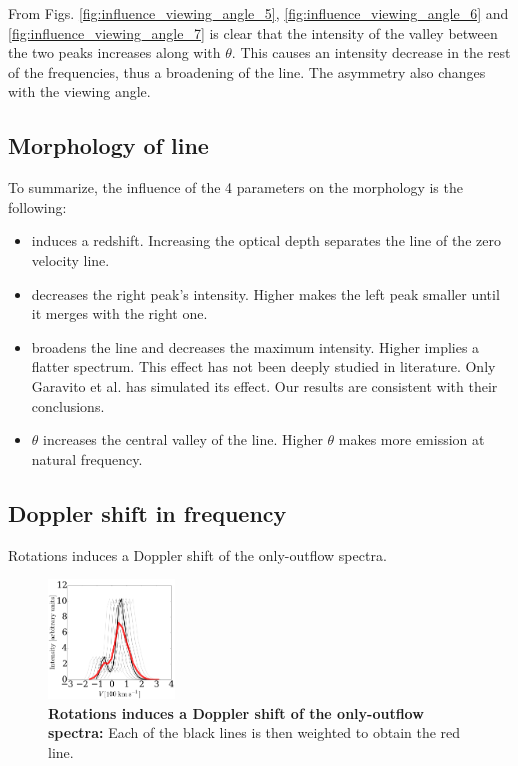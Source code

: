 \documentclass[twocolappendix]{latex/emulateapj}
\begin{document}
From Figs. \ref{fig:influence_viewing_angle_5}, \ref{fig:influence_viewing_angle_6} and \ref{fig:influence_viewing_angle_7} is clear that the intensity of the valley between the two peaks increases along with $\theta$. This causes an intensity decrease in the rest of the frequencies, thus a broadening of the line. The asymmetry also changes with the viewing angle.\\


\subsection{Morphology of \lya line}

To summarize, the influence of the 4 parameters on the \lya morphology is the following: 

\begin{itemize}
	\item \tauh induces a redshift. Increasing the optical depth separates the line of the zero velocity line. \\
	\item \vout decreases the right peak's intensity. Higher \vout makes the left peak smaller until it merges with the right one. \\
	\item \vrot broadens the line and decreases the maximum intensity. Higher \vrot implies a flatter spectrum. This effect has not been deeply studied in literature. Only Garavito et al. \cite{Garavito14} has simulated its effect. Our results are consistent with their conclusions.
	\item $\theta$ increases the central valley of the line. Higher $\theta$ makes more emission at \lya natural frequency. \\ 
\end{itemize}

\subsection{Doppler shift in frequency}

Rotations induces a Doppler shift of the only-outflow spectra.\\

\begin{figure}[h!]
	\begin{center}
		\includegraphics[width=0.3\textwidth]{./figures/rotation_doppler_outflow}
	\end{center}
	\caption{\textbf{Rotations induces a Doppler shift of the only-outflow spectra:} Each of the black lines is then weighted to obtain the red line.
		\label{fig:rotation_doppler_outflow}}
\end{figure}
\end{document}
